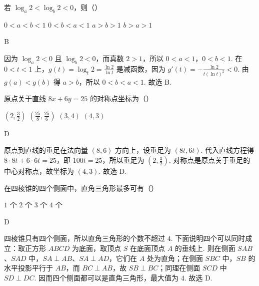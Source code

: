 \documentclass[UTF8,a4paper,oneside,11pt]{ctexbook}
\begin{document}
\begin{problem}
若 \(\log_a 2 < \log_b 2 < 0\)，则（\quad）

\choices
    {\(0 < a < b < 1\)}
    {\(0 < b < a < 1\)}
    {\(a > b > 1\)}
    {\(b > a > 1\)}

\begin{answer}
B
\end{answer}

\begin{solution}
因为 \(\log_a2<0\) 且 \(\log_b2<0\)，而真数 \(2>1\)，所以 \(0<a<1\)，\(0<b<1\). 在 \(0<t<1\) 上，\(g(t)=\log_t2=\frac{\ln2}{\ln t}\) 是减函数，因为 \(g'(t)=-\frac{\ln2}{t(\ln t)^2}<0\). 由 \(g(a)<g(b)\) 得 \(a>b\)，所以 \(0<b<a<1\). 故选 B.
\end{solution}
\end{problem}

\begin{problem}
原点关于直线 \(8x + 6y = 25\) 的对称点坐标为（\quad）

\choices
    {\(\left(2,\frac{3}{2}\right)\)}
    {\(\left(\frac{25}{8}, \frac{25}{6}\right)\)}
    {\(\left(3,4\right)\)}
    {\(\left(4,3\right)\)}

\begin{answer}
D
\end{answer}

\begin{solution}
原点到直线的垂足在法向量 \((8,6)\) 方向上，设垂足为 \((8t,6t)\). 代入直线方程得 \(8\cdot8t+6\cdot6t=25\)，即 \(100t=25\)，所以垂足为 \(\left(2,\frac{3}{2}\right)\). 对称点是原点关于垂足的中心对称点，故坐标为 \(\left(4,3\right)\). 故选 D.
\end{solution}
\end{problem}

\begin{problem}
在四棱锥的四个侧面中，直角三角形最多可有（\quad）

\choices
    {\(1\) 个}
    {\(2\) 个}
    {\(3\) 个}
    {\(4\) 个}

\begin{answer}
D
\end{answer}

\begin{solution}
四棱锥只有四个侧面，所以直角三角形的个数不超过 \(4\). 下面说明四个可以同时成立：取正方形 \(ABCD\) 为底面，取顶点 \(S\) 在底面顶点 \(A\) 的垂线上. 则在侧面 \(SAB\)、\(SAD\) 中，\(SA\perp AB\)、\(SA\perp AD\)，它们在 \(A\) 处为直角；在侧面 \(SBC\) 中，\(SB\) 的水平投影平行于 \(AB\)，而 \(BC\perp AB\)，故 \(SB\perp BC\)；同理在侧面 \(SCD\) 中 \(SD\perp DC\). 因而四个侧面都可以是直角三角形，最大值为 \(4\). 故选 D.
\end{solution}
\end{problem}
\end{document}
